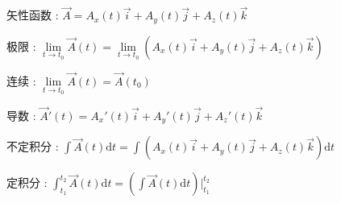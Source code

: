 \documentclass[UTF8, 12pt]{ctexart}
\begin{document}
	
	矢性函数 : $ \vec{A} = A_{x}(t)\vec{i} + A_{y}(t)\vec{j} + A_{z}(t)\vec{k} $

	极限 : $ \lim\limits_{t \to t_{0}}\vec{A}(t) = \lim\limits_{t \to t_{0}}(A_{x}(t)\vec{i} + A_{y}(t)\vec{j} + A_{z}(t)\vec{k}) $

	连续 : $ \lim\limits_{t \to t_{0}}\vec{A}(t) = \vec{A}(t_{0}) $

	导数 : $ \vec{A}'(t) = A_{x}'(t)\vec{i} + A_{y}'(t)\vec{j} + A_{z}'(t)\vec{k} $

	不定积分 : $ \int\vec{A}(t)\mathrm{d}t = \int(A_{x}(t)\vec{i} + A_{y}(t)\vec{j} + A_{z}(t)\vec{k})\mathrm{d}t $

	定积分 : $ \int_{t_{1}}^{t_{2}}\vec{A}(t)\mathrm{d}t = (\int\vec{A}(t)\mathrm{d}t)\left.\right|_{t_{1}}^{t_{2}} $
\end{document}
